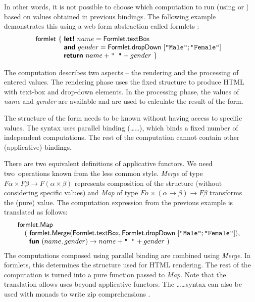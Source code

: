 \documentclass[runningheads,a4paper]{llncs}
\begin{document}
In other words, it is not possible to choose which computation to run (using  or 
) based on values obtained in previous  bindings. The following 
example demonstrates this using a web form abstraction called formlets \cite{formlets}:
%
\begin{equation*}
\begin{array}{l}
\ident{formlet}~\{~ \kvd{let!}~name = \ident{Formlet}.\ident{textBox} \\
\hspace{4.1em} \kvd{and}~gender = \ident{Formlet}.\ident{dropDown}~[\texttt{"Male"}; \texttt{"Female"}] \\
\hspace{4.1em} \kvd{return}~name + \texttt{" "} + gender ~\}
\end{array}
\end{equation*}

The computation describes two aspects -- the rendering and the processing of entered values.
The rendering phase uses the fixed structure to produce HTML with text-box and drop-down elements.
In the processing phase, the values of \emph{name} and \emph{gender} are available and are used to
calculate the result of the form.

The structure of the form needs to be known without having access to specific values. The syntax
uses parallel binding (\ldots{}\ldots), which binds a fixed number of independent
computations. The rest of the computation cannot contain other (applicative) bindings.

There are two equivalent definitions of applicative functors. We need two~operations known
from the less common style. \emph{Merge} of type $F\alpha \times F\beta \rightarrow F(\alpha\times\beta)$
represents composition of the structure (without considering specific values) and \emph{Map} of 
type $F\alpha \times (\alpha \rightarrow \beta) \rightarrow F\beta$ transforms the (pure) value.
The computation expression from the previous example is translated as follows:
%
\vspace{-0.3em}
\begin{equation*}
\begin{array}{l}
\ident{formlet}.\ident{Map} \\
\quad (~\ident{formlet}.\ident{Merge}(\ident{Formlet}.\ident{textBox}, 
  \ident{Formlet}.\ident{dropDown}~[\texttt{"Male"}; \texttt{"Female"}]),  \\
\quad~~\kvd{fun}~(name, gender) \rightarrow name + \texttt{" "} + gender~)
\end{array}
\vspace{-0.3em}
\end{equation*}
%
The computations composed using parallel binding are combined using \emph{Merge}. In formlets, 
this determines the structure used for HTML rendering. The rest of the computation is turned into 
a pure function passed to \emph{Map}. Note that the translation allows uses beyond applicative 
functors. The \ldots{}\ldots syntax can also be used with monads to write 
zip comprehensions \cite{monad-compre}.
\end{document}
